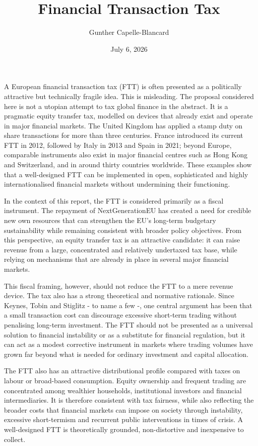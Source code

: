 \documentclass[../main]{subfiles}
\begin{document}
\title{Financial Transaction Tax}
\author{Gunther Capelle-Blancard}
\date{July 6, 2026}
\maketitle


A European financial transaction tax (FTT) is often presented as a politically attractive but technically fragile idea. This is misleading. The proposal considered here is not a utopian attempt to tax global finance in the abstract. It is a pragmatic equity transfer tax, modelled on devices that already exist and operate in major financial markets. The United Kingdom has applied a stamp duty on share transactions for more than three centuries. France introduced its current FTT in 2012, followed by Italy in 2013 and Spain in 2021; beyond Europe, comparable instruments also exist in major financial centres such as Hong Kong and Switzerland, and in around thirty countries worldwide. These examples show that a well-designed FTT can be implemented in open, sophisticated and highly internationalised financial markets without undermining their functioning.

In the context of this report, the FTT is considered primarily as a fiscal instrument. The repayment of NextGenerationEU has created a need for credible new own resources that can strengthen the EU's long-term budgetary sustainability while remaining consistent with broader policy objectives. From this perspective, an equity transfer tax is an attractive candidate: it can raise revenue from a large, concentrated and relatively undertaxed tax base, while relying on mechanisms that are already in place in several major financial markets.

This fiscal framing, however, should not reduce the FTT to a mere revenue device. The tax also has a strong theoretical and normative rationale. Since Keynes, Tobin and Stiglitz - to name a few -, one central argument has been that a small transaction cost can discourage excessive short-term trading without penalising long-term investment. The FTT should not be presented as a universal solution to financial instability or as a substitute for financial regulation, but it can act as a modest corrective instrument in markets where trading volumes have grown far beyond what is needed for ordinary investment and capital allocation.

The FTT also has an attractive distributional profile compared with taxes on labour or broad-based consumption. Equity ownership and frequent trading are concentrated among wealthier households, institutional investors and financial intermediaries. It is therefore consistent with tax fairness, while also reflecting the broader costs that financial markets can impose on society through instability, excessive short-termism and recurrent public interventions in times of crisis. A well-designed FTT is theoretically grounded, non-distortive and inexpensive to collect.
\end{document}
